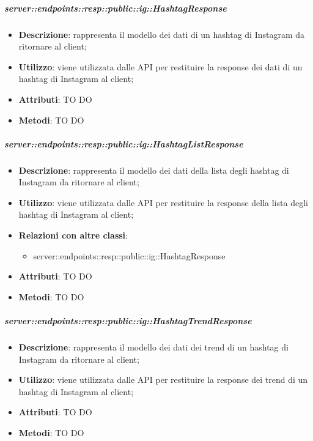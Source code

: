     \subparagraph{server::endpoints::resp::public::ig::HashtagResponse} %
    \label{subp:bdsm_app_server_endpoints_resp_public_ig_hashtagresponse}
    \begin{itemize}
      \item \textbf{Descrizione}: rappresenta il modello dei dati di un hashtag di Instagram da ritornare al client;
      \item \textbf{Utilizzo}: viene utilizzata dalle API per restituire la response dei dati di un hashtag di Instagram al client;
      
	  \item \textbf{Attributi}: TO DO
	  \item \textbf{Metodi}: TO DO
      \end{itemize}

    \subparagraph{server::endpoints::resp::public::ig::HashtagListResponse} %
    \label{subp:bdsm_app_server_endpoints_resp_public_ig_hashtaglistresponse}
    \begin{itemize}
      \item \textbf{Descrizione}: rappresenta il modello dei dati della lista degli hashtag di Instagram da ritornare al client;
      \item \textbf{Utilizzo}: viene utilizzata dalle API per restituire la response della lista degli hashtag di Instagram al client;
      \item \textbf{Relazioni con altre classi}:
        \begin{itemize}
          \item server::endpoints::resp::public::ig::HashtagResponse
        \end{itemize}
	  \item \textbf{Attributi}: TO DO
	  \item \textbf{Metodi}: TO DO
      \end{itemize}

    \subparagraph{server::endpoints::resp::public::ig::HashtagTrendResponse} %
    \label{subp:bdsm_app_server_endpoints_resp_public_ig_hashtagtrendresponse}
    \begin{itemize}
      \item \textbf{Descrizione}: rappresenta il modello dei dati dei trend di un hashtag di Instagram da ritornare al client;
      \item \textbf{Utilizzo}: viene utilizzata dalle API per restituire la response dei trend di un hashtag di Instagram al client;
      
	  \item \textbf{Attributi}: TO DO
	  \item \textbf{Metodi}: TO DO
      \end{itemize}

